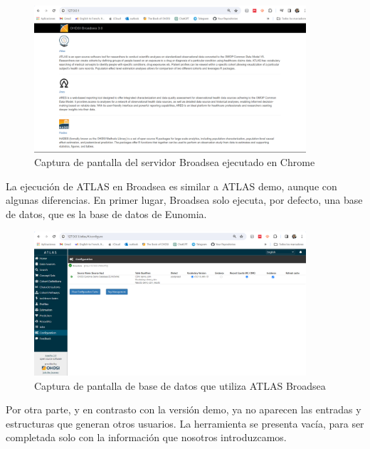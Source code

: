 \documentclass{article}
\begin{document}
\begin{enumerate}
\begin{figure}[H]
    \centering
    \includegraphics[width=0.90\textwidth]{images/broadseaCap.png}
     \caption{Captura de pantalla del servidor Broadsea ejecutado en Chrome}
    \label{fig:broadseaCap}
\end{figure}

    La ejecución de ATLAS en Broadsea es similar a ATLAS demo, aunque con algunas diferencias. En primer lugar, Broadsea solo ejecuta, por defecto, una base de datos, que es la base de datos de Eunomia.

\begin{figure}[H]
    \centering
    \includegraphics[width=0.90\textwidth]{images/atlasBroadseaDB.png}
     \caption{Captura de pantalla de base de datos que utiliza ATLAS Broadsea}
    \label{fig:atlasBroadseaDB}
\end{figure}

    Por otra parte, y en contrasto con la versión demo, ya no aparecen las entradas y estructuras que generan otros usuarios. La herramienta se presenta vacía, para ser completada solo con la información que nosotros introduzcamos.


\end{enumerate}
\end{document}
